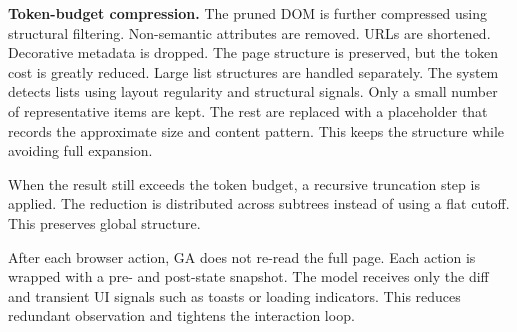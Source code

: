 \textbf{Token-budget compression.} The pruned DOM is further compressed using structural filtering. Non-semantic attributes are removed. URLs are shortened. Decorative metadata is dropped. The page structure is preserved, but the token cost is greatly reduced. Large list structures are handled separately. The system detects lists using layout regularity and structural signals. Only a small number of representative items are kept. The rest are replaced with a placeholder that records the approximate size and content pattern. This keeps the structure while avoiding full expansion.

When the result still exceeds the token budget, a recursive truncation step is applied. The reduction is distributed across subtrees instead of using a flat cutoff. This preserves global structure.

After each browser action, GA does not re-read the full page. Each action is wrapped with a pre- and post-state snapshot. The model receives only the diff and transient UI signals such as toasts or loading indicators. This reduces redundant observation and tightens the interaction loop.









